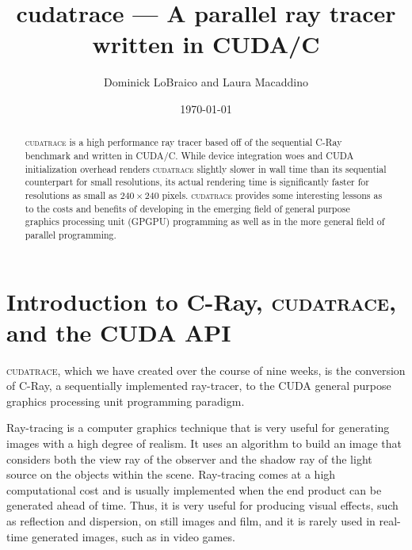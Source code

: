 \documentclass[12pt]{article}
\begin{document}
\lstset{language=C,breaklines=true,frame=single,basicstyle=\footnotesize}

\title{cudatrace --- A parallel ray tracer written in CUDA/C}
\author{Dominick LoBraico and Laura Macaddino}
\date{\today}
\maketitle

\begin{abstract}
    \textsc{cudatrace} is a high performance ray tracer based off of the sequential C-Ray benchmark and written in CUDA/C. While device integration woes and CUDA initialization overhead renders \textsc{cudatrace} slightly slower in wall time than its sequential counterpart for small resolutions, its actual rendering time is significantly faster for resolutions as small as $240 \times 240$ pixels. \textsc{cudatrace} provides some interesting lessons as to the costs and benefits of developing in the emerging field of general purpose graphics processing unit (GPGPU) programming as well as in the more general field of parallel programming.
\end{abstract}

\pagebreak
\tableofcontents
\listoffigures
\listoftables
\pagebreak


\section[Introduction]{Introduction to C-Ray, \textsc{cudatrace}, and the CUDA API}
\textsc{cudatrace}, which we have created over the course of nine weeks, is the conversion of C-Ray, a sequentially implemented ray-tracer, to the CUDA general purpose graphics processing unit programming paradigm.

Ray-tracing is a computer graphics technique that is very useful for generating images with a high degree of realism. It uses an algorithm to build an image that considers both the view ray of the observer and the shadow ray of the light source on the objects within the scene. Ray-tracing comes at a high computational cost and is usually implemented when the end product can be generated ahead of time. Thus, it is very useful for producing visual effects, such as reflection and dispersion, on still images and film, and it is rarely used in real-time generated images, such as in video games.
\end{document}
